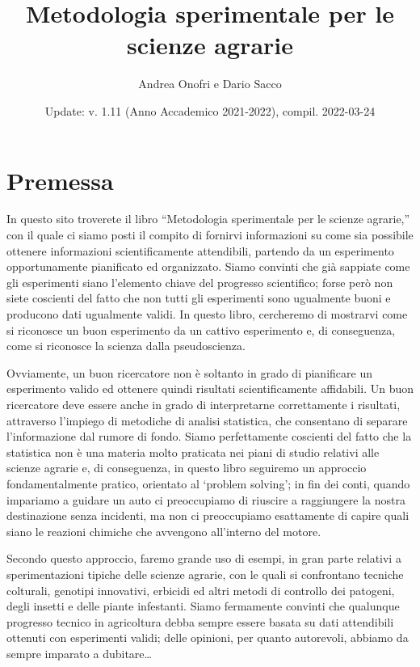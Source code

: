 \documentclass[a4paper,12pt,oneside]{book}
\author{Andrea Onofri e Dario Sacco}
\date{Update: v. 1.11 (Anno Accademico 2021-2022), compil. 2022-03-24}
\title{Metodologia sperimentale per le scienze agrarie}
\subtitle{}
\begin{document}
\maketitle
\tableofcontents

\hypertarget{premessa}{%
\chapter*{Premessa}\label{premessa}}

In questo sito troverete il libro ``Metodologia sperimentale per le scienze agrarie,'' con il quale ci siamo posti il compito di fornirvi informazioni su come sia possibile ottenere informazioni scientificamente attendibili, partendo da un esperimento opportunamente pianificato ed organizzato. Siamo convinti che già sappiate come gli esperimenti siano l'elemento chiave del progresso scientifico; forse però non siete coscienti del fatto che non tutti gli esperimenti sono ugualmente buoni e producono dati ugualmente validi. In questo libro, cercheremo di mostrarvi come si riconosce un buon esperimento da un cattivo esperimento e, di conseguenza, come si riconosce la scienza dalla pseudoscienza.

Ovviamente, un buon ricercatore non è soltanto in grado di pianificare un esperimento valido ed ottenere quindi risultati scientificamente affidabili. Un buon ricercatore deve essere anche in grado di interpretarne correttamente i risultati, attraverso l'impiego di metodiche di analisi statistica, che consentano di separare l'informazione dal rumore di fondo. Siamo perfettamente coscienti del fatto che la statistica non è una materia molto praticata nei piani di studio relativi alle scienze agrarie e, di conseguenza, in questo libro seguiremo un approccio fondamentalmente pratico, orientato al `problem solving'; in fin dei conti, quando impariamo a guidare un auto ci preoccupiamo di riuscire a raggiungere la nostra destinazione senza incidenti, ma non ci preoccupiamo esattamente di capire quali siano le reazioni chimiche che avvengono all'interno del motore.

Secondo questo approccio, faremo grande uso di esempi, in gran parte relativi a sperimentazioni tipiche delle scienze agrarie, con le quali si confrontano tecniche colturali, genotipi innovativi, erbicidi ed altri metodi di controllo dei patogeni, degli insetti e delle piante infestanti. Siamo fermamente convinti che qualunque progresso tecnico in agricoltura debba sempre essere basata su dati attendibili ottenuti con esperimenti validi; delle opinioni, per quanto autorevoli, abbiamo da sempre imparato a dubitare\ldots{}
\end{document}
